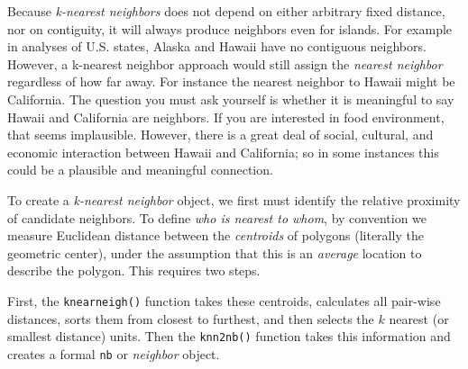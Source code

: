\documentclass[
]{book}
\newenvironment{Shaded}{\begin{snugshade}}{\end{snugshade}}
\newcommand{\AttributeTok}[1]{\textcolor[rgb]{0.77,0.63,0.00}{#1}}
\newcommand{\CommentTok}[1]{\textcolor[rgb]{0.56,0.35,0.01}{\textit{#1}}}
\newcommand{\DecValTok}[1]{\textcolor[rgb]{0.00,0.00,0.81}{#1}}
\newcommand{\FunctionTok}[1]{\textcolor[rgb]{0.00,0.00,0.00}{#1}}
\newcommand{\NormalTok}[1]{#1}
\newcommand{\OtherTok}[1]{\textcolor[rgb]{0.56,0.35,0.01}{#1}}
\newcommand{\SpecialCharTok}[1]{\textcolor[rgb]{0.00,0.00,0.00}{#1}}
\newenvironment{rmdnote}[1]
  {
  \begin{itemize}
  \renewcommand{\labelitemi}{
    \raisebox{-.7\height}[0pt][0pt]{
      {\setkeys{Gin}{width=3em,keepaspectratio}\texttt{[image: images/\#1]}}
    }
  }
  \setlength{\fboxsep}{1em}
  \begin{note}
  \item
  }
  {
  \end{note}
  \end{itemize}
  }
\begin{document}
\begin{rmdnote}{note}
Because \emph{k-nearest neighbors} does not depend on either arbitrary fixed distance, nor on contiguity, it will always produce neighbors even for islands. For example in analyses of U.S. states, Alaska and Hawaii have no contiguous neighbors. However, a k-nearest neighbor approach would still assign the \emph{nearest neighbor} regardless of how far away. For instance the nearest neighbor to Hawaii might be California. The question you must ask yourself is whether it is meaningful to say Hawaii and California are neighbors. If you are interested in food environment, that seems implausible. However, there is a great deal of social, cultural, and economic interaction between Hawaii and California; so in some instances this could be a plausible and meaningful connection.

\end{rmdnote}

To create a \emph{k-nearest neighbor} object, we first must identify the relative proximity of candidate neighbors. To define \emph{who is nearest to whom}, by convention we measure Euclidean distance between the \emph{centroids} of polygons (literally the geometric center), under the assumption that this is an \emph{average} location to describe the polygon. This requires two steps.

First, the \texttt{knearneigh()} function takes these centroids, calculates all pair-wise distances, sorts them from closest to furthest, and then selects the \(k\) nearest (or smallest distance) units. Then the \texttt{knn2nb()} function takes this information and creates a formal \texttt{nb} or \emph{neighbor} object.

\begin{Shaded}
\end{Shaded}
\end{document}
